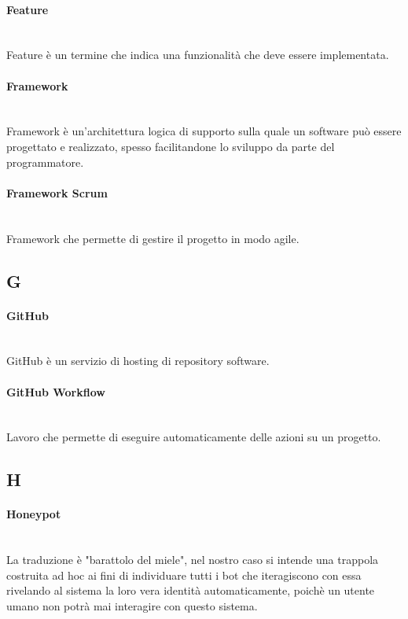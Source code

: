 \paragraph{Feature}~\smallskip \\
Feature è un termine che indica una funzionalità che deve essere implementata.

\paragraph{Framework}~\smallskip \\
Framework è un'architettura logica di supporto sulla quale un software può essere progettato e realizzato, spesso facilitandone lo sviluppo da parte del programmatore.

\paragraph{Framework Scrum}~\smallskip \\
Framework che permette di gestire il progetto in modo agile.

\newpage
{}
\subsection*{G}
\paragraph{GitHub}~\smallskip \\
GitHub è un servizio di hosting di repository software.

\paragraph{GitHub Workflow}~\smallskip \\
Lavoro che permette di eseguire automaticamente delle azioni su un progetto.
\newpage
{}
\subsection*{H}
\paragraph{Honeypot}~\smallskip \\
La traduzione è "barattolo del miele", nel nostro caso si intende una trappola costruita ad hoc ai fini di individuare tutti i bot che iteragiscono con essa rivelando al sistema la loro vera identità automaticamente, poichè un utente umano non potrà mai interagire con questo sistema.


